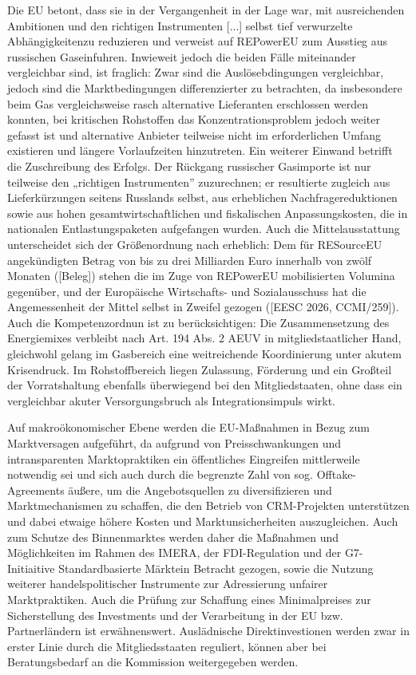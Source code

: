 \documentclass[12pt,a4paper,oneside]{book} %
\begin{document}
Die EU betont, dass sie in der Vergangenheit in der Lage war, \glqq mit ausreichenden Ambitionen und den richtigen Instrumenten [...] selbst tief verwurzelte Abhängigkeiten\grqq zu reduzieren und verweist auf REPowerEU zum Ausstieg aus russischen Gaseinfuhren. Inwieweit jedoch die beiden Fälle miteinander vergleichbar sind, ist fraglich: Zwar sind die Auslösebdingungen vergleichbar, jedoch sind die Marktbedingungen differenzierter zu betrachten, da insbesondere beim Gas vergleichsweise rasch alternative Lieferanten erschlossen werden konnten, bei kritischen Rohstoffen das Konzentrationsproblem jedoch weiter gefasst ist und alternative Anbieter teilweise nicht im erforderlichen Umfang existieren und längere Vorlaufzeiten hinzutreten. Ein weiterer Einwand betrifft die Zuschreibung des Erfolgs. Der Rückgang russischer Gasimporte ist nur teilweise den „richtigen Instrumenten” zuzurechnen; er resultierte zugleich aus Lieferkürzungen seitens Russlands selbst, aus erheblichen Nachfragereduktionen sowie aus hohen gesamtwirtschaftlichen und fiskalischen Anpassungskosten, die in nationalen Entlastungspaketen aufgefangen wurden. Auch die Mittelausstattung unterscheidet sich der Größenordnung nach erheblich: Dem für RESourceEU angekündigten Betrag von bis zu drei Milliarden Euro innerhalb von zwölf Monaten ([Beleg]) stehen die im Zuge von REPowerEU mobilisierten Volumina gegenüber, und der Europäische Wirtschafts- und Sozialausschuss hat die Angemessenheit der Mittel selbst in Zweifel gezogen ([EESC 2026, CCMI/259]). Auch die Kompetenzordnun ist zu berücksichtigen: Die Zusammensetzung des Energiemixes verbleibt nach Art. 194 Abs. 2 AEUV in mitgliedstaatlicher Hand, gleichwohl gelang im Gasbereich eine weitreichende Koordinierung unter akutem Krisendruck. Im Rohstoffbereich liegen Zulassung, Förderung und ein Großteil der Vorratshaltung ebenfalls überwiegend bei den Mitgliedstaaten, ohne dass ein vergleichbar akuter Versorgungsbruch als Integrationsimpuls wirkt.

Auf makroökonomischer Ebene werden die EU-Maßnahmen in Bezug zum Marktversagen aufgeführt, da aufgrund von Preisschwankungen und intransparenten Marktopraktiken ein öffentliches Eingreifen mittlerweile notwendig sei und sich auch durch die begrenzte Zahl von sog. Offtake-Agreements äußere, um die Angebotsquellen zu diversifizieren und Marktmechanismen zu schaffen, die den Betrieb von CRM-Projekten unterstützen und dabei etwaige höhere Kosten und Marktunsicherheiten auszugleichen. Auch zum Schutze des Binnenmarktes werden daher die Maßnahmen und Möglichkeiten im Rahmen des IMERA, der FDI-Regulation und der G7-Initiaitive \glqq Standardbasierte Märkte\grqq in Betracht gezogen, sowie die Nutzung weiterer handelspolitischer Instrumente zur Adressierung unfairer Marktpraktiken. Auch die Prüfung zur Schaffung eines Minimalpreises zur Sicherstellung des Investments und der Verarbeitung in der EU bzw. Partnerländern ist erwähnenswert. Auslädnische Direktinvestionen werden zwar in erster Linie durch die Mitgliedsstaaten reguliert, können aber bei Beratungsbedarf an die Kommission weitergegeben werden.
\end{document}
